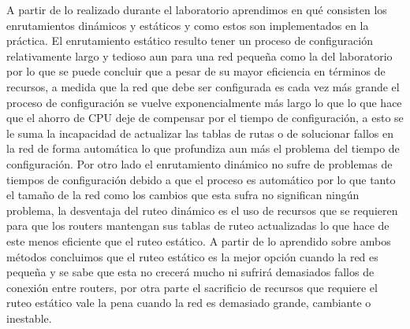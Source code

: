 ﻿\documentclass[spanish]{udpreport}
\begin{document}
 A partir de lo realizado durante el laboratorio aprendimos en qué consisten los enrutamientos dinámicos y estáticos y como estos son implementados en la práctica. El enrutamiento estático resulto tener un proceso de configuración relativamente largo y tedioso aun para una red pequeña como la del laboratorio por lo que se puede concluir que a pesar de su mayor eficiencia en términos de recursos, a medida que la red que debe ser configurada es cada vez más grande el proceso de configuración se vuelve exponencialmente más largo lo que lo que hace que el ahorro de CPU deje de compensar por el tiempo de configuración, a esto se le suma la incapacidad de actualizar las tablas de rutas o de solucionar fallos en la red de forma automática lo que profundiza aun más el problema del tiempo de configuración. Por otro lado el enrutamiento dinámico no sufre de problemas de tiempos de configuración debido a que el proceso es automático por lo que tanto el tamaño de la red como los cambios que esta sufra no significan ningún problema, la desventaja del ruteo dinámico es el uso de recursos que se requieren para que los routers mantengan sus tablas de ruteo actualizadas lo que hace de este menos eficiente que el ruteo estático. A partir de lo aprendido sobre ambos métodos concluimos que el ruteo estático es la mejor opción cuando la red es pequeña y se sabe que esta no crecerá mucho ni sufrirá demasiados fallos de conexión entre routers, por otra parte el sacrificio de recursos que requiere el ruteo estático vale la pena cuando la red es demasiado grande, cambiante o inestable.



\listoffigures
\end{document}
